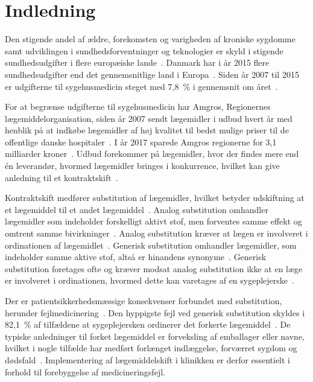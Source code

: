 \chapter{Indledning}
Den stigende andel af ældre, forekomsten og varigheden af kroniske sygdomme samt udviklingen i sundhedsforventninger og teknologier er skyld i stigende sundhedsudgifter i flere europæiske lande~\citep{Ess2003}. Danmark har i år 2015 flere sundhedsudgifter end det gennemsnitlige land i Europa~\citep{EU2017}. Siden år 2007 til 2015 er udgifterne til sygehusmedicin steget med 7,8~\% i gennemsnit om året~\citep{Sundhed2016}.

For at begrænse udgifterne til sygehusmedicin har Amgros, Regionernes lægemiddelorganisation, siden år 2007 sendt lægemidler i udbud hvert år med henblik på at indkøbe lægemidler af høj kvalitet til bedst mulige priser til de offentlige danske hospitaler~\citep{Amgros2018b}. I år 2017 sparede Amgros regionerne for 3,1 milliarder kroner~\citep{Amgros2017b}. Udbud forekommer på lægemidler, hvor der findes mere end én leverandør, hvormed lægemidler bringes i konkurrence, hvilket kan give anledning til et kontraktskift~\citep{Amgros2015}.

Kontraktskift medfører substitution af lægemidler, hvilket betyder udskiftning at et lægemiddel til et andet lægemiddel~\citep{DanskSelskabforPatientsikkerhed2009}. %
Analog substitution omhandler lægemidler som indeholder forskelligt aktivt stof, men forventes samme effekt og omtrent samme bivirkninger~\citep{Kairi2017}. Analog substitution kræver at lægen er involveret i ordinationen af lægemidlet~\citep{DanskSelskabforPatientsikkerhed2009}.
Generisk substitution omhandler lægemidler, som indeholder samme aktive stof, altså er hinandens synonyme~\citep{Kairi2017}. Generisk substitution foretages ofte og kræver modsat analog substitution ikke at en læge er involveret i ordinationen, hvormed dette kan varetages af en sygeplejerske~\citep{DanskSelskabforPatientsikkerhed2009}. 

Der er patientsikkerhedsmæssige konsekvenser forbundet med substitution, herunder fejlmedicinering~\citep{Hakonsen2010}. %
Den hyppigste fejl ved generisk substitution skyldes i 82,1~\% af tilfældene at sygeplejersken ordinerer det forkerte lægemiddel~\citep{Hakonsen2010}. De typiske anledninger til forket lægemiddel er forveksling af emballager eller navne, hvilket i nogle tilfælde har medført forlænget indlæggelse, forværret sygdom og dødsfald~\citep{DanskSelskabforPatientsikkerhed2009}. Implementering af lægemiddelskift i klinikken er derfor essentielt i forhold til forebyggelse af medicineringsfejl.

